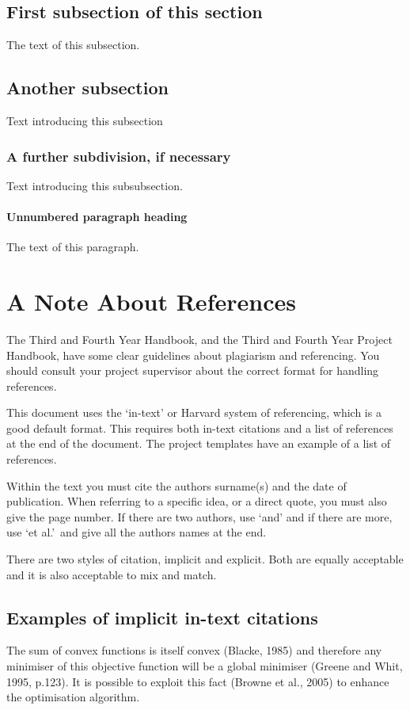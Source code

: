 \documentclass[a4paper, 12pt, notitlepage]{report}
\begin{document}
\subsection{First subsection of this section}
%
The text of this subsection.

\subsection{Another subsection}
%
Text introducing this subsection

\subsubsection{A further subdivision, if necessary}
%
Text introducing this subsubsection.

\paragraph{Unnumbered paragraph heading}
The text of this paragraph.

\section{A Note About References}
%
The Third and Fourth Year Handbook, and the Third and Fourth Year Project Handbook, have some clear guidelines about plagiarism and referencing.
You should consult your project supervisor about the correct format for handling references.

This document uses the `in-text' or Harvard system of referencing, which is a good default format.
This requires both in-text citations and a list of references at the end of the document.
The project templates have an example of a list of references.

Within the text you must cite the authors surname(s) and the date of publication.
When referring to a specific idea, or a direct quote, you must also give the page number.
If there are two authors, use `and' and if there are more, use `et al.'\ and give all the authors names at the end.

There are two styles of citation, implicit and explicit.
Both are equally acceptable and it is also acceptable to mix and match.

\subsection{Examples of implicit in-text citations}
%
The sum of convex functions is itself convex (Blacke, 1985) and therefore any minimiser of this objective function will be a global minimiser (Greene and Whit, 1995, p.123). It is possible to exploit this fact (Browne et al., 2005) to enhance the optimisation algorithm.
\end{document}
